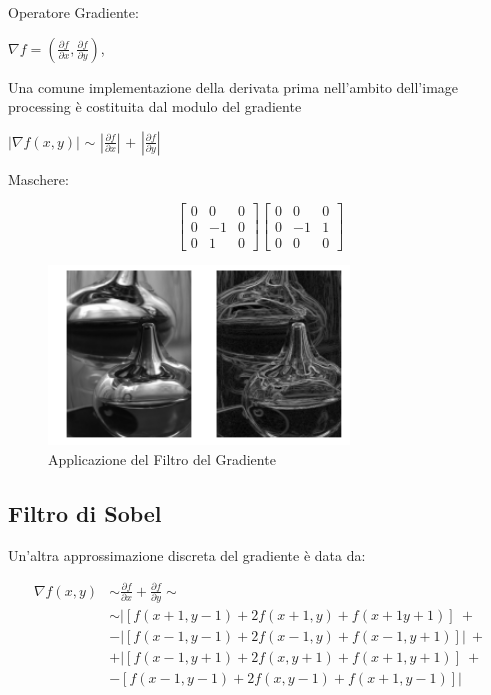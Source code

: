 Operatore Gradiente:

\begin{center}
    $\nabla f=(\frac{\partial{f}}{\partial{x}},
        \frac{\partial{f}}{\partial{y}})$,
\end{center}

Una comune implementazione della derivata prima nell'ambito dell'image
processing è costituita dal modulo del gradiente

\begin{center}
    $| \nabla f(x,y) |$ $\sim$ $|\frac{\partial{f}}{\partial{x}}|$ $+$
    $|\frac{\partial{f}}{\partial{y}}|$
\end{center}

Maschere:

\begin{center}
    \[
        \begin{bmatrix}
            0 & 0  & 0 \\
            0 & -1 & 0 \\
            0 & 1  & 0
        \end{bmatrix}
        \begin{bmatrix}
            0 & 0  & 0 \\
            0 & -1 & 1 \\
            0 & 0  & 0
        \end{bmatrix}
    \]
\end{center}

\begin{figure}[H]
    \centering
    \includegraphics[width=8cm, keepaspectratio]{capitoli/immagini/imgs/gradiente.png}
    \caption{Applicazione del Filtro del Gradiente}
\end{figure}

\subsection{Filtro di Sobel}
Un'altra approssimazione discreta del gradiente è data da:

\begin{align*}
    \nabla f(x,y) & \sim \frac{\partial{f}}{\partial{x}} + \frac{\partial{f}}{\partial{y}} \sim \\
                  & \sim  |[f(x+1,y-1) + 2f(x+1,y) + f(x+1 y+1)]  \ +                           \\
                  & - |[f(x-1, y-1)+2f(x-1,y) + f(x-1, y+1)]|     \ +                           \\
                  & + |[f(x-1, y+1) + 2f(x,y+1)+f(x+1,y+1)]       \ +                           \\
                  & - [f(x-1,y -1) + 2f(x,y-1) + f(x+1,y-1)]|
\end{align*}

